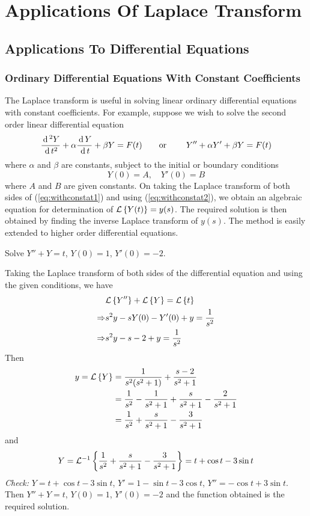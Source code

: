 \documentclass[../main-sheet.tex]{subfiles}
\begin{document}
\chapter{Applications Of Laplace Transform}
\section{Applications To Differential Equations}
\subsection{Ordinary Differential Equations With Constant Coefficients}
The Laplace transform is useful in solving linear ordinary differential equations with constant coefficients. For example, suppose we wish to solve the second order linear differential equation
\begin{equation}
    \label{eq:withconstat1}
    \frac{\,\mathrm{d}\,^2 Y}{\,\mathrm{d}\, t^2}+ \alpha \frac{\,\mathrm{d}\, Y}{\,\mathrm{d}\, t}+\beta Y=F(t)\qquad \text{or }\qquad Y'' + \alpha Y' + \beta Y = F(t)
\end{equation}
where $ \alpha $ and $ \beta $ are constants, subject to the initial or boundary conditions
\begin{equation}
    \label{eq:withconstat2}
    Y(0) = A,\quad Y'(0) = B
\end{equation}
where $ A $ and $ B $ are given constants. On taking the Laplace transform of both sides of (\ref{eq:withconstat1}) and using (\ref{eq:withconstat2}), we obtain an algebraic equation for determination of $ \mathcal{L}\left\{ Y(t)\right\} = y(s) $. The required solution is then obtained by finding the inverse Laplace transform of $ y(s) $. The method is easily extended to higher order differential equations.
\begin{prob}
    Solve $ Y''+Y=t $, $ Y(0)=1 $, $ Y'(0)=-2 $.
\end{prob}
\begin{soln}
    Taking the Laplace transform of both sides of the differential equation and using the given conditions, we have
    \begin{align*}
        &\mathcal{L}\left\{ Y''\right\}+\mathcal{L}\left\{ Y\right\}=\mathcal{L}\left\{ t\right\}\\
        \Rightarrow&s^2y-sY(0)-Y'(0)+y=\frac{1}{s^2}\\
        \Rightarrow&s^2y-s-2+y=\frac{1}{s^2}
    \end{align*}
    Then
    \begin{align*}
        y=\mathcal{L}\left\{ Y\right\}&=\frac{1}{s^2(s^2+1)}+\frac{s-2}{s^2+1}\\
        &=\frac{1}{s^2}-\frac{1}{s^2+1}+\frac{s}{s^2+1}-\frac{2}{s^2+1}\\
        &=\frac{1}{s^2}+\frac{s}{s^2+1}-\frac{3}{s^2+1}
    \end{align*}
    and 
    \[Y=\mathcal{L}^{-1}\left\{ \frac{1}{s^2}+\frac{s}{s^2+1}-\frac{3}{s^2+1}\right\}=t+\cos t-3\sin t\]
    \emph{Check:} $ Y=t+\cos t-3\sin t $, $ Y'=1-\sin t-3\cos t $, $ Y''=-\cos t+3\sin t $. Then $ Y''+Y=t $, $ Y(0)=1 $, $ Y'(0)=-2 $ and the function obtained is the required solution.
\end{soln}
\end{document}
